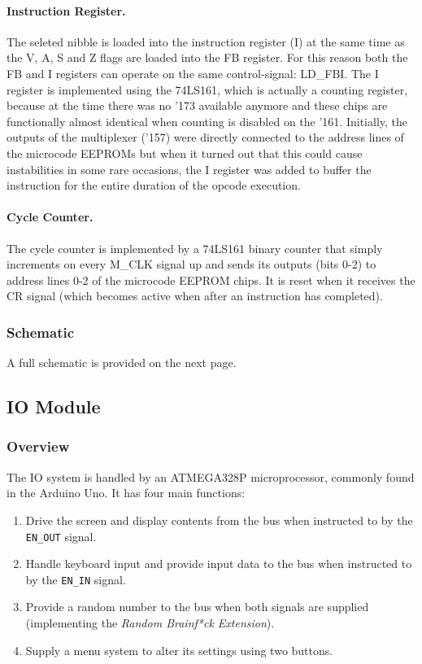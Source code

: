 \paragraph{Instruction Register.} The seleted nibble is loaded into the instruction register (I) at the same time as the V, A, S and Z flags are loaded into the FB register. For this reason both the FB and I registers can operate on the same control-signal: LD\_FBI. The I register is implemented using the 74LS161, which is actually a counting register, because at the time there was no '173 available anymore and these chips are functionally almost identical when counting is disabled on the '161. Initially, the outputs of the multiplexer ('157) were directly connected to the address lines of the microcode EEPROMs but when it turned out that this could cause instabilities in some rare occasions, the I register was added to buffer the instruction for the entire duration of the opcode execution.
 
\paragraph{Cycle Counter.} The cycle counter is implemented by a 74LS161 binary counter that simply increments on every M\_CLK signal up and sends its outputs (bits 0-2) to address lines 0-2 of the microcode EEPROM chips. It is reset when it receives the CR signal (which becomes active when after an instruction has completed).


\subsubsection{Schematic}
A full schematic is provided on the next page.


\subsection{IO Module} \label{sec:implementation:io}
\subsubsection{Overview}
The IO system is handled by an ATMEGA328P microprocessor, commonly found in the Arduino Uno. It has four main functions:
\begin{enumerate}
\item Drive the screen and display contents from the bus when instructed to by the \texttt{EN\_OUT} signal.
\item Handle keyboard input and provide input data to the bus when instructed to by the \texttt{EN\_IN} signal.
\item Provide a random number to the bus when both signals are supplied (implementing the \emph{Random Brainf*ck Extension}).
\item Supply a menu system to alter its settings using two buttons.
\end{enumerate}

